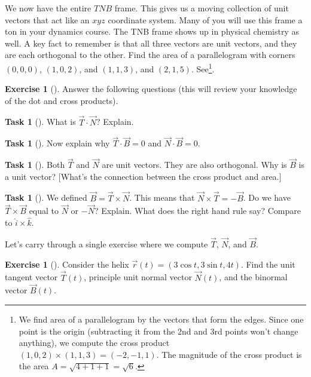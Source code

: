 \documentclass[10pt,]{book}
\theoremstyle{plain}
\theoremstyle{definition}
\theoremstyle{definition}
\theoremstyle{definition}
\theoremstyle{definition}
\newtheorem{exploration}[project]{Exercise}
\newtheorem{task}[project]{Task}
\theoremstyle{definition}
\numberwithin{equation}{section}
\begin{document}
We now have the entire \(TNB\) frame. This gives us a moving collection of unit vectors that act like an \(xyz\) coordinate system. Many of you will use this frame a ton in your dynamics course. The TNB frame shows up in physical chemistry as well. A key fact to remember is that all three vectors are unit vectors, and they are each orthogonal to the other.%
Find the area of a parallelogram with corners \((0,0,0)\), \((1,0,2)\), and \((1,1,3)\), and \((2,1,5)\). See\footnote{We find area of a parallelogram by the vectors that form the edges. Since one point is the origin (subtracting it from the 2nd and 3rd points won't change anything), we compute the cross product \((1,0,2)\times 
(1,1,3) 
= (-2,-1,1)\). The magnitude of the cross product is the area \(A = \sqrt{4+1+1}=\sqrt{6}\).\label{fn-13}}.%
\begin{exploration}[]\label{exploration-178}
Answer the following questions (this will review your knowledge of the dot and cross products).%
\begin{task}[]\label{task-438}
What is \(\vec T\cdot \vec N\)? Explain.%
\end{task}
\begin{task}[]\label{task-439}
Now explain why \(\vec T\cdot \vec B=0\) and \(\vec N\cdot \vec B=0\).%
\end{task}
\begin{task}[]\label{task-440}
Both \(\vec T\) and \(\vec N\) are unit vectors. They are also orthogonal. Why is \(\vec B\) is a unit vector? [What's the connection between the cross product and area.]%
\end{task}
\begin{task}[]\label{task-441}
We defined \(\vec B=\vec T\times \vec N\). This means that \(\vec N\times \vec T=-\vec B\).  Do we have \(\vec T\times \vec B\) equal to \(\vec N\) or \(-\vec N\)? Explain. What does the right hand rule say? Compare to \(\hat i\times \hat k\).%
%
\end{task}
\end{exploration}
Let's carry through a single exercise where we compute \(\vec T\), \(\vec N\), and \(\vec B\).%
\begin{exploration}[]\label{helix_example_of_T_N_and_B}
Consider the helix \(\vec r(t) = (3\cos t,3\sin t, 4t)\). Find the unit tangent vector \(\vec T(t)\), principle unit normal vector \(\vec N(t)\), and the binormal vector \(\vec B(t)\).%
\end{exploration}
\typeout{************************************************}
\typeout{************************************************}
\end{document}
